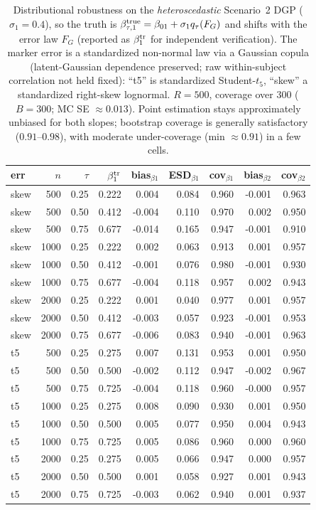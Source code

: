 \begin{table}[t]\centering\small
\caption{Distributional robustness on the \emph{heteroscedastic} Scenario~2 DGP ($\sigma_1=0.4$), so the truth is $\beta_{\tau,1}^{\rm true}=\beta_{01}+\sigma_1 q_\tau(F_G)$ and shifts with the error law $F_G$ (reported as $\beta_1^{\rm tr}$ for independent verification). The marker error is a standardized non-normal law via a Gaussian copula (latent-Gaussian dependence preserved; raw within-subject correlation not held fixed): ``t5'' is standardized Student-$t_5$, ``skew'' a standardized right-skew lognormal. $R=500$, coverage over $300$ ($B=300$; MC SE $\approx0.013$). Point estimation stays approximately unbiased for both slopes; bootstrap coverage is generally satisfactory ($0.91$--$0.98$), with moderate under-coverage (min $\approx0.91$) in a few cells.}
\label{tab:dist}\begin{tabular}{lrr r rr r rr}\toprule
err&$n$&$\tau$&$\beta_1^{\rm tr}$&bias$_{\beta1}$&ESD$_{\beta1}$&cov$_{\beta1}$&bias$_{\beta2}$&cov$_{\beta2}$\\\midrule
skew & 500 & 0.25 & 0.222 & 0.004 & 0.084 & 0.960 & -0.001 & 0.963 \\
skew & 500 & 0.50 & 0.412 & -0.004 & 0.110 & 0.970 & 0.002 & 0.950 \\
skew & 500 & 0.75 & 0.677 & -0.014 & 0.165 & 0.947 & -0.001 & 0.910 \\
\addlinespace
skew & 1000 & 0.25 & 0.222 & 0.002 & 0.063 & 0.913 & 0.001 & 0.957 \\
skew & 1000 & 0.50 & 0.412 & -0.001 & 0.076 & 0.980 & -0.001 & 0.930 \\
skew & 1000 & 0.75 & 0.677 & -0.004 & 0.118 & 0.957 & 0.002 & 0.943 \\
\addlinespace
skew & 2000 & 0.25 & 0.222 & 0.001 & 0.040 & 0.977 & 0.001 & 0.957 \\
skew & 2000 & 0.50 & 0.412 & -0.003 & 0.057 & 0.923 & -0.001 & 0.953 \\
skew & 2000 & 0.75 & 0.677 & -0.006 & 0.083 & 0.940 & -0.001 & 0.963 \\
\addlinespace
t5 & 500 & 0.25 & 0.275 & 0.007 & 0.131 & 0.953 & 0.001 & 0.950 \\
t5 & 500 & 0.50 & 0.500 & -0.002 & 0.112 & 0.947 & -0.002 & 0.967 \\
t5 & 500 & 0.75 & 0.725 & -0.004 & 0.118 & 0.960 & -0.000 & 0.957 \\
\addlinespace
t5 & 1000 & 0.25 & 0.275 & 0.008 & 0.090 & 0.930 & 0.001 & 0.950 \\
t5 & 1000 & 0.50 & 0.500 & 0.005 & 0.077 & 0.950 & 0.004 & 0.943 \\
t5 & 1000 & 0.75 & 0.725 & 0.005 & 0.086 & 0.960 & 0.000 & 0.960 \\
\addlinespace
t5 & 2000 & 0.25 & 0.275 & 0.005 & 0.066 & 0.947 & 0.000 & 0.957 \\
t5 & 2000 & 0.50 & 0.500 & 0.001 & 0.058 & 0.927 & 0.001 & 0.943 \\
t5 & 2000 & 0.75 & 0.725 & -0.003 & 0.062 & 0.940 & 0.001 & 0.937 \\
\bottomrule\end{tabular}\end{table}
